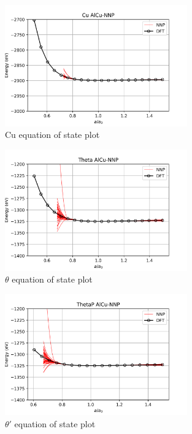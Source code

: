 \documentclass{article}
\begin{document}
\begin{figure}[H]%
\centering%
\includegraphics[width=0.7\textwidth,center]{figures/EOS_AlCu-NNP_Cu.png}%
\caption{Cu equation of state plot}%
\end{figure}

\begin{figure}[H]%
\centering%
\includegraphics[width=0.7\textwidth,center]{figures/EOS_AlCu-NNP_Theta.png}%
\caption{$\theta$ equation of state plot}%
\end{figure}

\begin{figure}[H]%
\centering%
\includegraphics[width=0.7\textwidth,center]{figures/EOS_AlCu-NNP_ThetaP.png}%
\caption{$\theta'$ equation of state plot}%
\end{figure}
\end{document}
